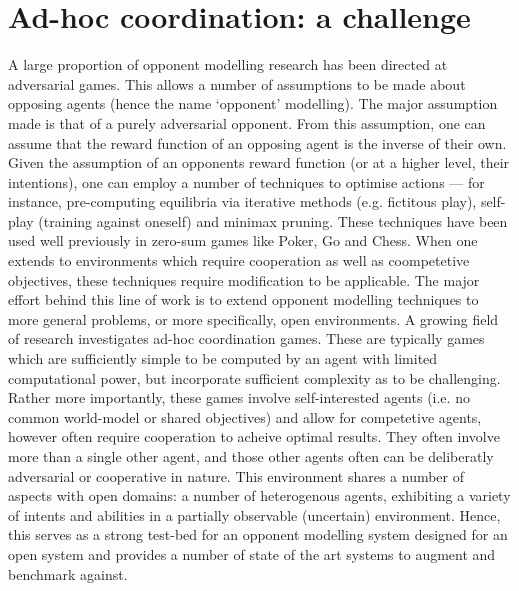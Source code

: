 \section{Ad-hoc coordination: a challenge}
A large proportion of opponent modelling research has been directed at adversarial games. 
This allows a number of assumptions to be made about opposing agents (hence the name `opponent' modelling). The major assumption made is that of a purely adversarial opponent. From this assumption, one can assume that the reward function of an opposing agent is the inverse of their own. Given the assumption of an opponents reward function (or at a higher level, their intentions), one can employ a number of techniques to optimise actions --- for instance, pre-computing equilibria via iterative methods (e.g. fictitous play), self-play (training against oneself) and minimax pruning. These techniques have been used well previously in zero-sum games like Poker, Go and Chess. When one extends to environments which require cooperation as well as coompetetive objectives, these techniques require modification to be applicable. 
\newline \newline
The major effort behind this line of work is to extend opponent modelling techniques to more general problems, or more specifically, open environments. A growing field of research investigates ad-hoc coordination games. These are typically games which are sufficiently simple to be computed by an agent with limited computational power, but incorporate sufficient complexity as to be challenging. Rather more importantly, these games involve self-interested agents (i.e. no common world-model or shared objectives) and allow for competetive agents, however often require cooperation to acheive optimal results. They often involve more than a single other agent, and those other agents often can be deliberatly adversarial or cooperative in nature.
\newline \newline 
This environment shares a number of aspects with open domains: a number of heterogenous agents, exhibiting a variety of intents and abilities in a partially observable (uncertain) environment. Hence, this serves as a strong test-bed for an opponent modelling system designed for an open system and provides a number of state of the art systems to augment and benchmark against. 
